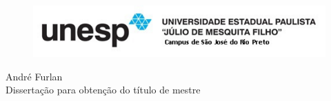 \thispagestyle{empty}
\begin{center}
	\par \null
	\begin{figure}[H]
		\centering \includegraphics[angle=-90]{unesp.pdf}
	\end{figure} 
	\vspace{3cm}
	\fontsize{14}{\baselineskip} \selectfont
	{André Furlan} \\  
	\vspace{4.5cm}
	\onehalfspacing
	\fontsize{14}{\baselineskip} \selectfont
	Dissertação para obtenção do título de mestre \\
\end{center}
